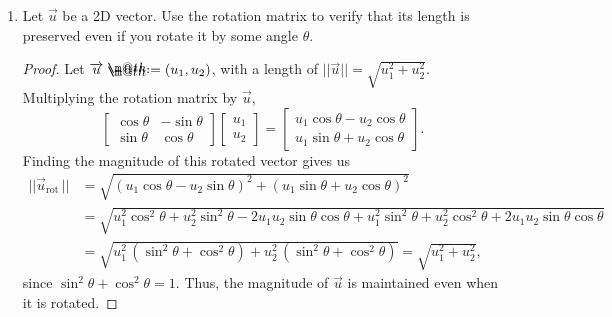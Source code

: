 \documentclass{article}
\makeatletter
\newcommand*{\defeq}{\mathrel{\rlap{%
                     \raisebox{0.3ex}{$\m@th\cdot$}}%
                     \raisebox{-0.3ex}{$\m@th\cdot$}}%
                     =}
\makeatother
\begin{document}
\begin{enumerate}
\begin{proof}
\begin{align*}
            \overrightarrow{u}_\text{rot} \cdot \overrightarrow{v}_\text{rot} &= \sin^2\theta \, (u_1 v_1 + u_2 v_2) + \cos^2\theta \, (u_1 v_1 + u_2 v_2) - \sin\theta\cos\theta \, (u_1 v_2 + u_2 v_1 ) + \sin\theta\cos\theta \, (u_1 v_2 + u_2 v_1 ) \\ 
            &= (u_1 v_1 + u_2 v_2 ) \, (\sin^2\theta + \cos^2\theta).    
        \end{align*} Since \(\sin^2\theta + \cos^2\theta = 1\), this simplifies to \(u_1 v_1 + u_2 v_2\), which is the original dot product, \(\overrightarrow{u} \cdot \overrightarrow{v}\). Thus, the dot product is preserved even when you rotate the vectors by some value \(\theta\). 
    \end{proof}
    \pagebreak
    \item Let \(\overrightarrow{u}\) be a 2D vector. Use the rotation matrix to verify that its length is preserved even if you rotate it by some angle \(\theta\).\begin{proof}
        Let \(\overrightarrow{u} \defeq (u_1, u_2)\), with a length of \(\big|\!\big| \overrightarrow{u} \big|\!\big| = \sqrt{u_1^2 + u_2^2}\). Multiplying the rotation matrix by \(\overrightarrow{u}\),\[
            \begin{bmatrix}
                \cos\theta & -\sin\theta \\ \sin\theta & \cos\theta
            \end{bmatrix} \begin{bmatrix}
                u_1 \\ u_2
            \end{bmatrix} = \begin{bmatrix}
                u_1\cos\theta - u_2\cos\theta \\ u_1\sin\theta + u_2\cos\theta
            \end{bmatrix}.
        \] Finding the magnitude of this rotated vector gives us\begin{align*}
            \big|\!\big| \overrightarrow{u}_{\text{rot}} \,\big|\!\big| &= \sqrt{{(u_1\cos\theta - u_2\sin\theta)}^2 + {(u_1\sin\theta + u_2\cos\theta)}^2} \\ 
            &= \sqrt{u_1^2\cos^2\theta + u_2^2\sin^2\theta - 2u_1 u_2 \sin\theta\cos\theta + u_1^2\sin^2\theta + u_2^2\cos^2\theta + 2u_1 u_2 \sin\theta\cos\theta} \\ 
            &= \sqrt{u_1^2 \, (\sin^2\theta + \cos^2\theta) + u_2^2\, (\sin^2\theta + \cos^2\theta)} = \sqrt{u_1^2 + u_2^2}, 
        \end{align*} since \(\sin^2\theta + \cos^2\theta = 1\). Thus, the magnitude of \(\overrightarrow{u}\) is maintained even when it is rotated.

\end{proof}
\end{enumerate}
\end{document}
